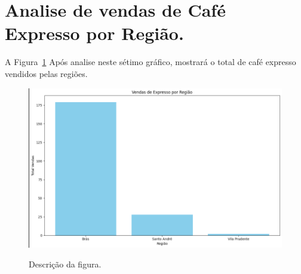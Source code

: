 \section{Analise de vendas de Café Expresso por Região.}
\label{sec:figura}
A Figura~\ref{figuras/Vendas-expresso-regiao.png} Após analise neste sétimo gráfico, mostrará o total de café expresso vendidos pelas regiões.
\begin{figure}[!ht]
	{\centering
		\caption{Descrição da figura.}
		\includegraphics[width=1.0\textwidth]{figuras/Vendas-expresso-regiao.png}
		\label{figuras/Vendas-expresso-regiao.png}
	}
\end{figure} \\ \\ \\ \\ \\ \\ \\ \\ \\  \\ \\ 

